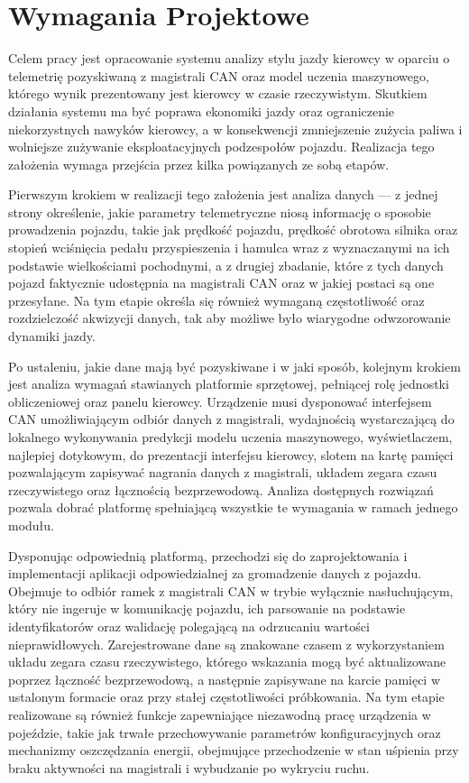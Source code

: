\clearpage %
\section{Wymagania Projektowe}
\label{sec:wymagania}

Celem pracy jest opracowanie systemu analizy stylu jazdy kierowcy w oparciu o
telemetrię pozyskiwaną z magistrali CAN oraz model uczenia maszynowego, którego
wynik prezentowany jest kierowcy w czasie rzeczywistym. Skutkiem działania
systemu ma być poprawa ekonomiki jazdy oraz ograniczenie niekorzystnych nawyków
kierowcy, a w konsekwencji zmniejszenie zużycia paliwa i wolniejsze zużywanie
eksploatacyjnych podzespołów pojazdu. Realizacja tego założenia wymaga przejścia
przez kilka powiązanych ze sobą etapów.

Pierwszym krokiem w realizacji tego założenia jest analiza danych — z jednej strony
określenie, jakie parametry telemetryczne niosą informację o sposobie prowadzenia
pojazdu, takie jak prędkość pojazdu, prędkość obrotowa silnika oraz stopień
wciśnięcia pedału przyspieszenia i hamulca wraz z wyznaczanymi na ich podstawie
wielkościami pochodnymi, a z drugiej zbadanie, które z tych danych pojazd faktycznie
udostępnia na magistrali CAN oraz w jakiej postaci są one przesyłane. Na tym etapie
określa się również wymaganą częstotliwość oraz rozdzielczość akwizycji danych, tak
aby możliwe było wiarygodne odwzorowanie dynamiki jazdy.

Po ustaleniu, jakie dane mają być pozyskiwane i w jaki sposób, kolejnym krokiem jest
analiza wymagań stawianych platformie sprzętowej, pełniącej rolę jednostki
obliczeniowej oraz panelu kierowcy. Urządzenie musi dysponować interfejsem CAN
umożliwiającym odbiór danych z magistrali, wydajnością wystarczającą do lokalnego
wykonywania predykcji modelu uczenia maszynowego, wyświetlaczem, najlepiej
dotykowym, do prezentacji interfejsu kierowcy, slotem na kartę pamięci pozwalającym
zapisywać nagrania danych z magistrali, układem zegara czasu rzeczywistego oraz
łącznością bezprzewodową. Analiza dostępnych rozwiązań pozwala dobrać platformę
spełniającą wszystkie te wymagania w ramach jednego modułu.

Dysponując odpowiednią platformą, przechodzi się do zaprojektowania i
implementacji aplikacji odpowiedzialnej za gromadzenie danych z pojazdu. Obejmuje
to odbiór ramek z magistrali CAN w trybie wyłącznie nasłuchującym, który nie ingeruje
w komunikację pojazdu, ich parsowanie na podstawie identyfikatorów oraz walidację
polegającą na odrzucaniu wartości nieprawidłowych. Zarejestrowane dane są
znakowane czasem z wykorzystaniem układu zegara czasu rzeczywistego, którego
wskazania mogą być aktualizowane poprzez łączność bezprzewodową, a następnie
zapisywane na karcie pamięci w ustalonym formacie oraz przy stałej częstotliwości
próbkowania. Na tym etapie realizowane są również funkcje zapewniające
niezawodną pracę urządzenia w pojeździe, takie jak trwałe przechowywanie
parametrów konfiguracyjnych oraz mechanizmy oszczędzania energii, obejmujące
przechodzenie w stan uśpienia przy braku aktywności na magistrali i wybudzanie po
wykryciu ruchu.

